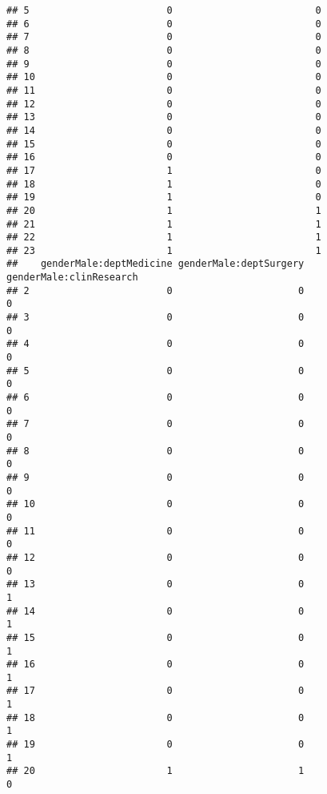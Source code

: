 \documentclass[]{article}
\begin{document}
\begin{verbatim}
## 5                        0                         0
## 6                        0                         0
## 7                        0                         0
## 8                        0                         0
## 9                        0                         0
## 10                       0                         0
## 11                       0                         0
## 12                       0                         0
## 13                       0                         0
## 14                       0                         0
## 15                       0                         0
## 16                       0                         0
## 17                       1                         0
## 18                       1                         0
## 19                       1                         0
## 20                       1                         1
## 21                       1                         1
## 22                       1                         1
## 23                       1                         1
##    genderMale:deptMedicine genderMale:deptSurgery genderMale:clinResearch
## 2                        0                      0                       0
## 3                        0                      0                       0
## 4                        0                      0                       0
## 5                        0                      0                       0
## 6                        0                      0                       0
## 7                        0                      0                       0
## 8                        0                      0                       0
## 9                        0                      0                       0
## 10                       0                      0                       0
## 11                       0                      0                       0
## 12                       0                      0                       0
## 13                       0                      0                       1
## 14                       0                      0                       1
## 15                       0                      0                       1
## 16                       0                      0                       1
## 17                       0                      0                       1
## 18                       0                      0                       1
## 19                       0                      0                       1
## 20                       1                      1                       0

\end{verbatim}
\end{document}
